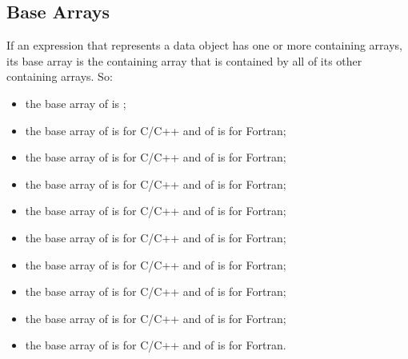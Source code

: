 
\subsection{Base Arrays}

If an expression that represents a data object has one or more containing
arrays, its base array is the containing array that is contained by all of
its other containing arrays. So:

\begin{itemize}
\item the base array of  is ;

\item the base array of  is  for C/C++ and of
       is  for Fortran;

\item the base array of  is  for C/C++ and of
       is  for Fortran;

\item the base array of  is  for C/C++ and of
       is  for Fortran;

\item the base array of  is  for C/C++ and of
       is  for Fortran;

\item the base array of  is  for C/C++ and
      of  is  for Fortran;

\item the base array of  is  for C/C++
      and of  is  for Fortran;

\item the base array of  is  for
      C/C++ and of  is  for
      Fortran;

\item the base array of  is  for
      C/C++ and of  is  for
      Fortran;

\item the base array of  is  for
      C/C++ and of  is  for
      Fortran.
\end{itemize}

